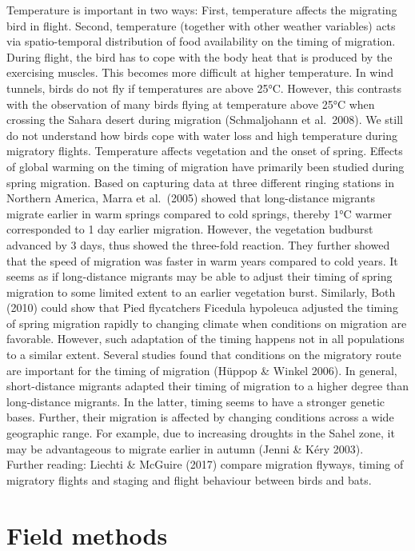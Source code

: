 \documentclass[
]{book}
\begin{document}
Temperature is important in two ways: First, temperature affects the migrating bird in flight. Second, temperature (together with other weather variables) acts via spatio-temporal distribution of food availability on the timing of migration.
During flight, the bird has to cope with the body heat that is produced by the exercising muscles. This becomes more difficult at higher temperature. In wind tunnels, birds do not fly if temperatures are above 25°C. However, this contrasts with the observation of many birds flying at temperature above 25°C when crossing the Sahara desert during migration (Schmaljohann et al.~2008). We still do not understand how birds cope with water loss and high temperature during migratory flights.
Temperature affects vegetation and the onset of spring. Effects of global warming on the timing of migration have primarily been studied during spring migration. Based on capturing data at three different ringing stations in Northern America, Marra et al.~(2005) showed that long-distance migrants migrate earlier in warm springs compared to cold springs, thereby 1°C warmer corresponded to 1 day earlier migration. However, the vegetation budburst advanced by 3 days, thus showed the three-fold reaction. They further showed that the speed of migration was faster in warm years compared to cold years. It seems as if long-distance migrants may be able to adjust their timing of spring migration to some limited extent to an earlier vegetation burst. Similarly, Both (2010) could show that Pied flycatchers Ficedula hypoleuca adjusted the timing of spring migration rapidly to changing climate when conditions on migration are favorable. However, such adaptation of the timing happens not in all populations to a similar extent. Several studies found that conditions on the migratory route are important for the timing of migration (Hüppop \& Winkel 2006).
In general, short-distance migrants adapted their timing of migration to a higher degree than long-distance migrants. In the latter, timing seems to have a stronger genetic bases. Further, their migration is affected by changing conditions across a wide geographic range. For example, due to increasing droughts in the Sahel zone, it may be advantageous to migrate earlier in autumn (Jenni \& Kéry 2003).\\
Further reading: Liechti \& McGuire (2017) compare migration flyways, timing of migratory flights and staging and flight behaviour between birds and bats.

\hypertarget{field-methods}{%
\chapter{Field methods}\label{field-methods}}
\end{document}
